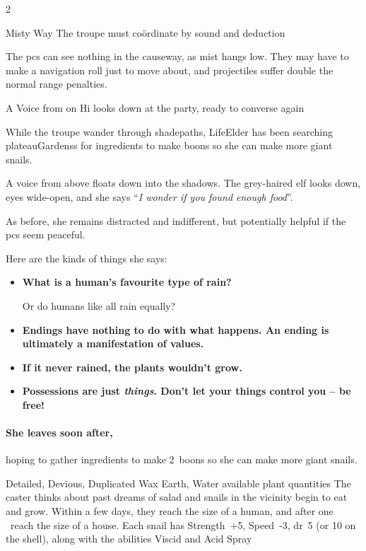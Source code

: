 \begin{multicols}{2}
\LifeElder

\showStdSpells

{Misty Way}%
{The troupe must co\"ordinate by sound and deduction}%

The \glspl{pc} can see nothing in the causeway, as mist hangs low.
They may have to make a navigation roll just to move about, and projectiles suffer double the normal range penalties.

{A Voice from on Hi}%
{ looks down at the party, ready to converse again}%

While the troupe wander through \gls{shadepaths}, \gls{LifeElder} has been searching \glspl{plateauGardens} for \glspl{ingredient} to make \glspl{boon} so she can make more giant snails.

\begin{boxtext}
  A voice from above floats down into the shadows.
  The grey-haired elf looks down, eyes wide-open, and she says ``\textit{I wonder if you found enough food}''.
\end{boxtext}

As before, she remains distracted and indifferent, but potentially helpful if the \glspl{pc} seem peaceful.

Here are the kinds of things she says:

\begin{itemize}
  \item[\adforn{54}]\bf
  What is a human's favourite type of rain?

  Or do humans like all rain equally?
  \item[\adforn{54}]\bf
  Endings have nothing to do with what happens.
  An ending is ultimately a manifestation of values.
  \item[\adforn{54}]\bf
  If it never rained, the plants wouldn't grow.
  \item[\adforn{54}]\bf
  Possessions are just \emph{things}.
  Don't let your things control you -- be free!
\end{itemize}

\paragraph{She leaves soon after,}
hoping to gather \glspl{ingredient} to make 2~\glspl{boon} so she can make more giant snails.

  {Detailed, Devious, Duplicated}%
  {Wax}%
  {Earth, Water}%
  {available plant quantities}%
  {The caster thinks about past dreams of salad and  snails in the vicinity begin to eat and grow.
  Within a few days, they reach the size of a human, and after one \showOnset\ reach the size of a house.
  Each snail has Strength~+5, Speed~-3, \gls{dr}~5 (or 10 on the shell), along with the abilities Viscid and Acid Spray}%
  {}



\end{multicols}
